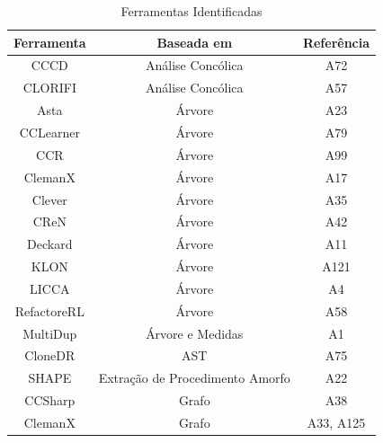 
\begin{table}[ht]
	\scriptsize
	\caption{Ferramentas Identificadas}
	\label{ferramentas}
	\begin{tabular}{@{}ccc@{}}
		\toprule
		\textbf{Ferramenta }   & \textbf{Baseada em }                     & \textbf{Referência }  \\ \bottomrule \toprule
		CCCD          & Análise Concólica               & A72
		\\ \hline
		CLORIFI       & Análise Concólica               & A57
		\\\hline
		Asta          & Árvore                          & A23
		\\\hline
		CCLearner     & Árvore                          & A79
		\\\hline
		CCR           & Árvore                          & A99
		\\\hline
		ClemanX       & Árvore                          & A17
		\\\hline
		Clever        & Árvore                          & A35
		\\\hline
		CReN          & Árvore                          & A42
		\\\hline 
		Deckard       & Árvore                          & A11
		\\\hline 
		KLON          & Árvore                          & A121
		\\\hline 
		LICCA         & Árvore                          & A4
		\\\hline 
		RefactoreRL   & Árvore                          & A58
		\\\hline
		MultiDup      & Árvore e Medidas                & A1
		\\\hline
		CloneDR       & AST                             & A75
		\\\hline
		SHAPE         & Extração de Procedimento Amorfo & A22
		\\\hline
		CCSharp       & Grafo                           & A38
		\\\hline
		ClemanX       & Grafo                           & A33, A125
		\\\hline

\end{tabular}
\end{table}
